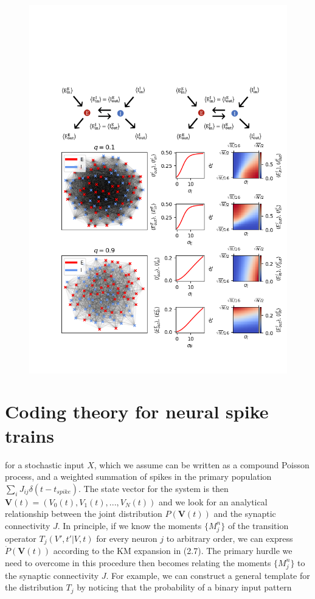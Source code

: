 \documentclass{ucetd}
\begin{document}
\begin{figure}
\centering
\includegraphics[width=150mm]{fig_9}
\end{figure}



\section{Coding theory for neural spike trains}


for a stochastic input $X$, which we assume can be written as a compound Poisson process, and a weighted summation of spikes in the primary population $\sum_{i}J_{ij}\delta(t-t_{spike})$. The state vector for the system is then $\mathbf{V}(t) = (V_{0}(t), V_{1}(t), ..., V_{N}(t))$ and we look for an analytical relationship between the joint distribution $P(\mathbf{V}(t))$ and the synaptic connectivity $J$. In principle, if we know the moments $\{M_{j}^{n}\}$  of the transition operator $T_{j}(V',t'|V,t)$ for every neuron $j$ to arbitrary order, we can express $\dot{P}(\mathbf{V}(t))$ according to the KM expansion in (2.7). The primary hurdle we need to overcome in this procedure then becomes relating the moments $\{M_{j}^{n}\}$ to the synaptic connectivity $J$. For example, we can construct a general template for the distribution $T_{j}$ by noticing that the probability of a binary input pattern
\end{document}
